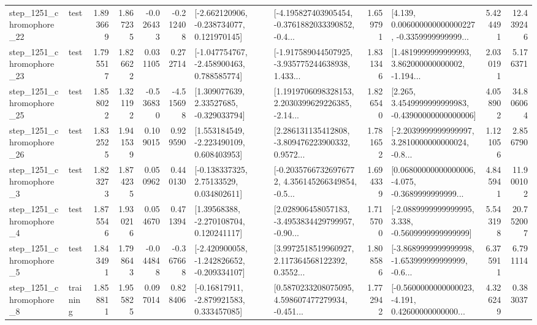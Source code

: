 \begin{tabular}{llrrrrllrlrr}
 step\_1251\_chromophore\_22 &      test &      1.893669 &    1.867235 &     -0.026433 & -0.212408 &   [-2.662120906, -0.238734077, 0.121970145] &  [-4.195827403905454, -0.3761882033390852, -0.4... &       1.659791 &  [4.139, 0.006000000000000227, -0.3359999999999... &            5.424491 &         12.439246 \\
 step\_1251\_chromophore\_23 &      test &      1.795517 &    1.826622 &      0.031105 &  0.272714 &   [-1.047754767, -2.458900463, 0.788585774] &  [-1.917589044507925, -3.935775244638938, 1.433... &       1.831346 &  [1.4819999999999993, 3.862000000000002, -1.194... &            2.030191 &          5.176371 \\
 step\_1251\_chromophore\_25 &      test &      1.858022 &    1.321192 &     -0.536830 & -4.515698 &     [1.309077639, 2.33527685, -0.329033794] &  [1.1919706098328153, 2.2030399629226385, -2.14... &       1.826540 &  [2.265, 3.4549999999999983, -0.43900000000000006] &            4.058902 &         34.806064 \\
 step\_1251\_chromophore\_26 &      test &      1.832525 &    1.941539 &      0.109015 &  0.929590 &    [1.553184549, -2.223490109, 0.608403953] &  [2.286131135412808, -3.809476223900332, 0.9572... &       1.781652 &  [-2.2039999999999997, 3.2810000000000024, -0.8... &            1.121056 &          2.856790 \\
  step\_1251\_chromophore\_3 &      test &      1.823273 &    1.874235 &      0.050962 &  0.440130 &     [-0.138337325, 2.75133529, 0.034802611] &  [-0.20357667326976772, 4.356145266349854, -0.5... &       1.694339 &  [0.06800000000000006, -4.075, -0.3689999999999... &            4.845941 &         11.900102 \\
  step\_1251\_chromophore\_4 &      test &      1.875546 &    1.930216 &      0.054670 &  0.471394 &     [1.39568388, -2.270108704, 0.120241117] &  [2.028906458057183, -3.4953834429799957, -0.90... &       1.715700 &  [-2.0889999999999995, 3.338, -0.5609999999999999] &            5.543198 &         20.752007 \\
  step\_1251\_chromophore\_5 &      test &      1.843491 &    1.798643 &     -0.044848 & -0.367668 &  [-2.420900058, -1.242826652, -0.209334107] &  [3.9972518519960927, 2.117364568122392, 0.3552... &       1.808586 &  [-3.8689999999999998, -1.653999999999999, -0.6... &            6.375911 &          6.791114 \\
  step\_1251\_chromophore\_8 &  training &      1.858811 &    1.955825 &      0.097014 &  0.828406 &    [-0.16817911, -2.879921583, 0.333457085] &  [0.5870233208075095, 4.598607477279934, -0.451... &       1.772942 &  [-0.5600000000000023, -4.191, 0.42600000000000... &            4.326249 &          0.383037 \\

\end{tabular}
